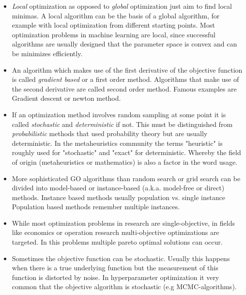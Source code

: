 \documentclass[english]{article}
\begin{document}
\begin{itemize}
  \item \textit{Local} optimization as opposed to \textit{global} optimization just aim to find local minimas. A local algorithm can be the basis of a global algorithm, for example with local optimization from different starting points. Most optimization problems in machine learning are local, since successful algorithms are usually designed that the parameter space is convex and can be minimizes efficiently.

  \item An algorithm which makes use of the first derivative of the objective function is called \textit{gradient based} or a first order method. Algorithms that make use of the second derivative are called second order method. Famous examples are Gradient descent or newton method.

  \item If an optimization method involves random sampling at some point it is called \textit{stochastic} and \textit{deterministic} if not. This must be distinguished from \textit{probabilistic} methods that used probability theory but are usually deterministic. In the metaheuristics community the terms "heuristic" is roughly used for "stochastic" and "exact" for deterministic. Whereby the field of origin (metaheuristics or mathematics) is also a factor in the  word usage.

  \item More sophisticated GO algorithms than random search or grid search can be divided into model-based or instance-based (a.k.a. model-free or direct) methods. Instance based methods usually population vs. single instance Population based methods remember multiple instances.

  \item While most optimization problems in research are single-objective, in fields like economics or operation research multi-objective optimizations are targeted. In this problems multiple pareto optimal solutions can occur.

  \item Sometimes the objective function can be stochastic. Usually this happens when there is a true underlying function but the measurement of this function is distorted by noise. In hyperparameter optimization it very common that the objective algorithm is stochastic (e.g MCMC-algorithms).

\end{itemize}
\end{document}
